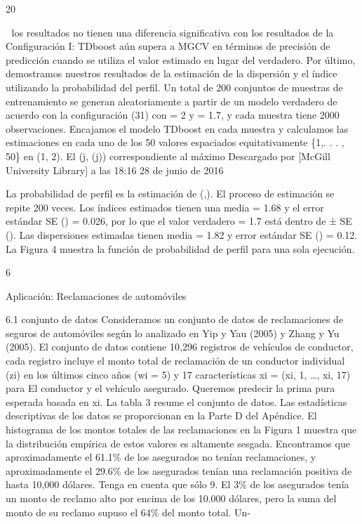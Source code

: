 \documentclass[]{article}
\begin{document}
20

 los resultados no tienen una diferencia significativa con los
resultados de la Configuración I: TDboost aún supera a MGCV en términos
de precisión de predicción cuando se utiliza el valor estimado en lugar
del verdadero. Por último, demostramos nuestros resultados de la
estimación de la dispersión y el índice utilizando la probabilidad del
perfil. Un total de 200 conjuntos de muestras de entrenamiento se
generan aleatoriamente a partir de un modelo verdadero de acuerdo con la
configuración (31) con = 2 y = 1.7, y cada muestra tiene 2000
observaciones. Encajamos el modelo TDboost en cada muestra y calculamos
las estimaciones en cada uno de los 50 valores espaciados
equitativamente \{1,. . . , 50\} en (1, 2). El (j, (j)) correspondiente
al máximo Descargado por {[}McGill University Library{]} a las 18:16 28
de junio de 2016

La probabilidad de perfil es la estimación de (,). El proceso de
estimación se repite 200 veces. Los índices estimados tienen una media =
1.68 y el error estándar SE () = 0.026, por lo que el valor verdadero =
1.7 está dentro de ± SE (). Las dispersiones estimadas tienen media =
1.82 y error estándar SE () = 0.12. La Figura 4 muestra la función de
probabilidad de perfil para una sola ejecución.

6

Aplicación: Reclamaciones de automóviles

6.1 conjunto de datos Consideramos un conjunto de datos de reclamaciones
de seguros de automóviles según lo analizado en Yip y Yau (2005) y Zhang
y Yu (2005). El conjunto de datos contiene 10,296 registros de vehículos
de conductor, cada registro incluye el monto total de reclamación de un
conductor individual (zi) en los últimos cinco años (wi = 5) y 17
características xi = (xi, 1, \ldots{}, xi, 17) para El conductor y el
vehículo asegurado. Queremos predecir la prima pura esperada basada en
xi. La tabla 3 resume el conjunto de datos. Las estadísticas
descriptivas de los datos se proporcionan en la Parte D del Apéndice. El
histograma de los montos totales de las reclamaciones en la Figura 1
muestra que la distribución empírica de estos valores es altamente
sesgada. Encontramos que aproximadamente el 61.1\% de los asegurados no
tenían reclamaciones, y aproximadamente el 29.6\% de los asegurados
tenían una reclamación positiva de hasta 10,000 dólares. Tenga en cuenta
que sólo 9. El 3\% de los asegurados tenía un monto de reclamo alto por
encima de los 10.000 dólares, pero la suma del monto de su reclamo
supuso el 64\% del monto total. Un-
\end{document}
